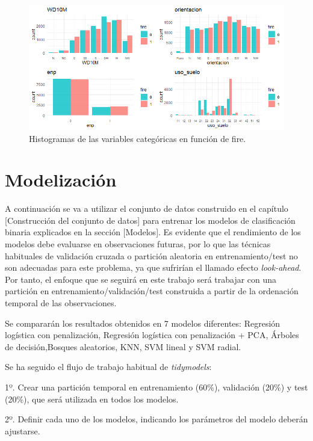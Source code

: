 \documentclass[12pt,a4paper,]{book}
\numberwithin{dummy}{section}
\theoremstyle{ocrenumbox}
\theoremstyle{blacknumex}
\theoremstyle{blacknumbox}
\theoremstyle{ocrenum}
\theoremstyle{ocrenum}
\begin{document}
\begin{figure}[h]
\centering
\includegraphics[width =\textwidth]{graficos/histogramas.png}
\caption{Histogramas de las variables categóricas en función de fire.}
\label{fig:histogramas}
\end{figure}

\hypertarget{modelizaciuxf3n}{%
\section{Modelización}\label{modelizaciuxf3n}}

A continuación se va a utilizar el conjunto de datos construido en el
capítulo {[}Construcción del conjunto de datos{]} para entrenar los
modelos de clasificación binaria explicados en la sección {[}Modelos{]}.
Es evidente que el rendimiento de los modelos debe evaluarse en
observaciones futuras, por lo que las técnicas habituales de validación
cruzada o partición aleatoria en entrenamiento/test no son adecuadas
para este problema, ya que sufrirían el llamado efecto
\emph{look-ahead}. Por tanto, el enfoque que se seguirá en este trabajo
será trabajar con una partición en entrenamiento/validación/test
construida a partir de la ordenación temporal de las observaciones.

Se compararán los resultados obtenidos en 7 modelos diferentes:
Regresión logística con penalización, Regresión logística con
penalización + PCA, Árboles de decisión,Bosques aleatorios, KNN, SVM
lineal y SVM radial.

Se ha seguido el flujo de trabajo habitual de \emph{tidymodels}:

1º. Crear una partición temporal en entrenamiento (60\%), validación
(20\%) y test (20\%), que será utilizada en todos los modelos.

2º. Definir cada uno de los modelos, indicando los parámetros del modelo
deberán ajustarse.
\end{document}
